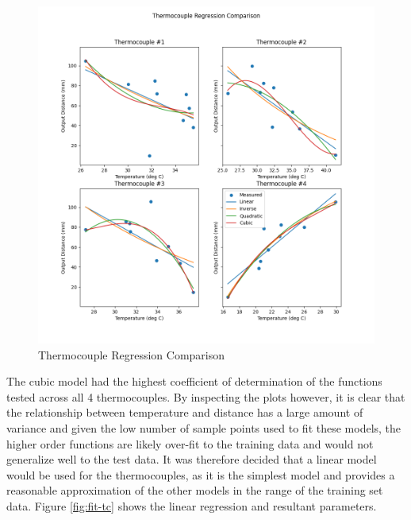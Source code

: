 \documentclass[12pt]{article}
\begin{document}
\begin{figure}[H]
    \centering
    \includegraphics[width=\linewidth]{images/Thermocouple Regressions.png}
    \caption{Thermocouple Regression Comparison}
    \label{fig:compare-tc} %
\end{figure}

The cubic model had the highest coefficient of determination of the functions tested across all 4 thermocouples. By inspecting the plots however, it is clear that the relationship between temperature and distance has a large amount of variance and given the low number of sample points used to fit these models, the higher order functions are likely over-fit to the training data and would not generalize well to the test data. It was therefore decided that a linear model would be used for the thermocouples, as it is the simplest model and provides a reasonable approximation of the other models in the range of the training set data. Figure \ref{fig:fit-tc} shows the linear regression and resultant parameters.
\end{document}

